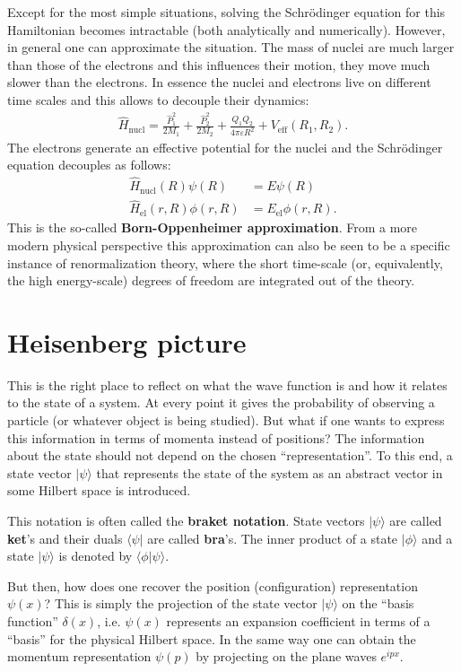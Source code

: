     Except for the most simple situations, solving the Schr\"odinger equation for this Hamiltonian becomes intractable (both analytically and numerically). However, in general one can approximate the situation. The mass of nuclei are much larger than those of the electrons and this influences their motion, they move much slower than the electrons. In essence the nuclei and electrons live on different time scales and this allows to decouple their dynamics:
    \begin{gather}
        \hat{H}_\mathrm{nucl} = \frac{\hat{P}_1^2}{2M_1} + \frac{\hat{P}_2^2}{2M_2} + \frac{Q_1Q_2}{4\pi\varepsilon R^2} + V_\mathrm{eff}(R_1,R_2).
    \end{gather}
    The electrons generate an effective potential for the nuclei and the Schr\"odinger equation decouples as follows:
    \begin{align}
        \hat{H}_\mathrm{nucl}(R)\psi(R) &= E\psi(R)\\
        \hat{H}_\mathrm{el}(r,R)\phi(r,R) &= E_\mathrm{el}\phi(r,R).
    \end{align}
    This is the so-called \textbf{Born-Oppenheimer approximation}. From a more modern physical perspective this approximation can also be seen to be a specific instance of renormalization theory, where the short time-scale (or, equivalently, the high energy-scale) degrees of freedom are integrated out of the theory.

\section{Heisenberg picture}

    This is the right place to reflect on what the wave function is and how it relates to the state of a system. At every point it gives the probability of observing a particle (or whatever object is being studied). But what if one wants to express this information in terms of momenta instead of positions? The information about the state should not depend on the chosen ``representation''. To this end, a state vector $|\psi\rangle$ that represents the state of the system as an abstract vector in some Hilbert space is introduced.
    \begin{notation}
        This notation is often called the \textbf{braket notation}. State vectors $|\psi\rangle$ are called \textbf{ket}'s and their duals $\langle\psi|$ are called \textbf{bra}'s. The inner product of a state $|\phi\rangle$ and a state $|\psi\rangle$ is denoted by $\langle\phi|\psi\rangle$.
    \end{notation}
    But then, how does one recover the position (configuration) representation $\psi(x)$? This is simply the projection of the state vector $|\psi\rangle$ on the ``basis function'' $\delta(x)$, i.e. $\psi(x)$ represents an expansion coefficient in terms of a ``basis'' for the physical Hilbert space. In the same way one can obtain the momentum representation $\psi(p)$ by projecting on the plane waves $e^{ipx}$.

